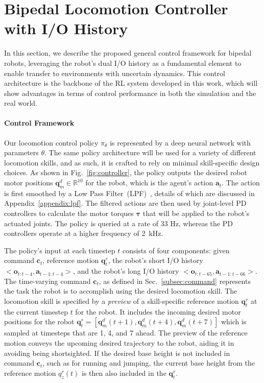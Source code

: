 \section{Bipedal Locomotion Controller with I/O History}\label{sec:controller}
In this section, we describe the proposed general control framework for bipedal robots, leveraging the robot's dual I/O history as a fundamental element to enable transfer to environments with uncertain dynamics. 
This control architecture is the backbone of the RL system developed in this work, which will show advantages in terms of control performance in both the simulation and the real world. 

\paragraph{Control Framework}
Our locomotion control policy $\pi_\theta$ is represented by a deep neural network with parameters $\theta$. 
The same policy architecture will be used for a variety of different locomotion skills, and as such, it is crafted to rely on minimal skill-specific design choices. 
As shown in Fig.~\ref{fig:controller}, the policy outputs the desired robot motor positions $\mathbf{q}^d_{m}\in \mathbb{R}^{10}$ for the robot, which is the agent's action $\mathbf{a}_t$. 
The action is first smoothed by a Low Pass Filter~(LPF)~\citep{peng2020learning}, details of which are discussed in Appendix~\ref{appendix:lpf}. The filtered actions are then used by joint-level PD controllers to calculate the motor torques $\bm{\tau}$ that will be applied to the robot's actuated joints. The policy is queried at a rate of 33 Hz, whereas the PD controllers operate at a higher frequency of 2~kHz.


The policy's input at each timestep $t$ consists of four components: given command $\mathbf{c}_t$, reference motion $\mathbf{q}^r_t$, the robot's short I/O history $<\mathbf{o}_{t:t-4}, \mathbf{a}_{t-1:t-4}>$, and the robot's long I/O history $<\mathbf{o}_{t:t-65}, \mathbf{a}_{t-1:t-66}>$.
The time-varying command $\mathbf{c}_t$, as defined in Sec.~\ref{subsec:command} represents the task the robot is to accomplish using the desired locomotion skill. 
The locomotion skill is specified by a \emph{preview} of a skill-specific reference motion $\mathbf{q}^r_t$ at the current timestep $t$ for the robot.
It includes the incoming desired motor positions for the robot $\mathbf{q}^r_t=[\mathbf{q}^d_m(t+1), \mathbf{q}^d_m(t+4), \mathbf{q}^d_m(t+7)]$ which is sampled at timesteps that are 1, 4, and 7 ahead. 
The preview of the reference motion conveys the upcoming desired trajectory to the robot, aiding it in avoiding being shortsighted.
If the desired base height is not included in command $\mathbf{c}_t$, such as for running and jumping, the current base height from the reference motion $q^r_z(t)$ is then also included in the $\mathbf{q}^r_t$. 


